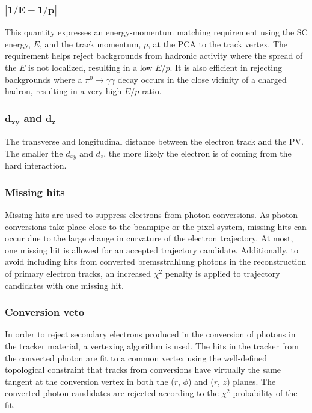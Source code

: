 \subsubsection*{$\bm{|1/E - 1/p|}$}
\noindent\justify  
This quantity expresses an energy-momentum matching requirement using the SC energy, $E$, and the track momentum, $p$, at the PCA to the track vertex. 
The requirement helps reject backgrounds from hadronic activity where the spread of the $E$ is not localized, resulting in a low $E/p$. 
It is also efficient in rejecting backgrounds where a $\pi^{0}\rightarrow\gamma\gamma$ decay occurs in the close vicinity of a charged hadron, resulting in a very high $E/p$ ratio.
\subsubsection*{$\bm{d_{xy}}$ and $\bm{d_{z}}$}
\noindent\justify  
The transverse and longitudinal distance between the electron track and the PV. 
The smaller the $d_{xy}$ and $d_{z}$, the more likely the electron is of coming from the hard interaction.
\subsubsection*{Missing hits}
\noindent\justify  
Missing hits are used to suppress electrons from photon conversions. 
As photon conversions take place close to the beampipe or the pixel system, missing hits can occur due to the large change in curvature of the electron trajectory. 
At most, one missing hit is allowed for an accepted trajectory candidate. 
Additionally, to avoid including hits from converted bremsstrahlung photons in the reconstruction of primary electron tracks, an increased $\chi^{2}$ penalty is applied to trajectory candidates with one missing hit.
\subsubsection*{Conversion veto}
\noindent\justify  
In order to reject secondary electrons produced in the conversion of photons in the tracker material, a vertexing algorithm is used. 
The hits in the tracker from the converted photon are fit to a common vertex using the well-defined topological constraint that tracks from conversions have virtually the same tangent at the conversion vertex in both the ($r$, $\phi$) and ($r$, $z$) planes. 
The converted photon candidates are rejected according to the $\chi^{2}$ probability of the fit.
